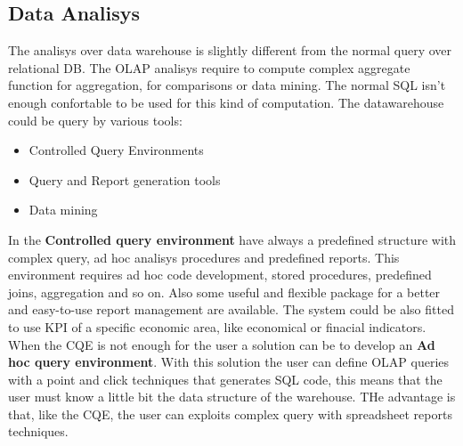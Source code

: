 \documentclass[12pt]{article}
\begin{document}
\subsection{Data Analisys} %
The analisys over data warehouse is slightly different from the normal query over relational DB. The OLAP analisys require to compute complex aggregate function for aggregation, for comparisons or data mining. The normal SQL isn't enough confortable to be used for this kind of computation. The datawarehouse could be query by various tools:
\begin{itemize}
  \item Controlled Query Environments
  \item Query and Report generation tools
  \item Data mining
\end{itemize}
In the \textbf{Controlled query environment} have always a predefined structure with complex query, ad hoc analisys procedures and predefined reports. This environment requires ad hoc code development, stored procedures, predefined joins, aggregation and so on. Also some useful and flexible package for a better and easy-to-use report management are available. The system could be also fitted to use KPI of a specific economic area, like economical or finacial indicators.\\
When the CQE is not enough for the user a solution can be to develop an \textbf{Ad hoc query environment}. With this solution the user can define OLAP queries with a point and click techniques that generates SQL code, this means that the user must know a little bit the data structure of the warehouse. THe advantage is that, like the CQE, the user can exploits complex query with spreadsheet reports techniques.
\end{document}
